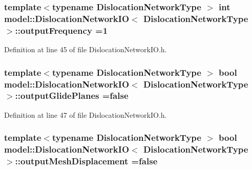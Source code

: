 \subsubsection[{output\+Frequency}]{\setlength{\rightskip}{0pt plus 5cm}template$<$typename Dislocation\+Network\+Type $>$ int {\bf model\+::\+Dislocation\+Network\+I\+O}$<$ Dislocation\+Network\+Type $>$\+::output\+Frequency =1\hspace{0.3cm}{\ttfamily [static]}}\label{structmodel_1_1_dislocation_network_i_o_a332e7031dfa21ac57b3d9816bb895007}


Definition at line 45 of file Dislocation\+Network\+I\+O.\+h.

\hypertarget{structmodel_1_1_dislocation_network_i_o_aeb79ef10bfde6bbb003b848cac1c305c}{}
\subsubsection[{output\+Glide\+Planes}]{\setlength{\rightskip}{0pt plus 5cm}template$<$typename Dislocation\+Network\+Type $>$ bool {\bf model\+::\+Dislocation\+Network\+I\+O}$<$ Dislocation\+Network\+Type $>$\+::output\+Glide\+Planes =false\hspace{0.3cm}{\ttfamily [static]}}\label{structmodel_1_1_dislocation_network_i_o_aeb79ef10bfde6bbb003b848cac1c305c}


Definition at line 47 of file Dislocation\+Network\+I\+O.\+h.

\hypertarget{structmodel_1_1_dislocation_network_i_o_affea60946cd055d674f5f35c799109ef}{}
\subsubsection[{output\+Mesh\+Displacement}]{\setlength{\rightskip}{0pt plus 5cm}template$<$typename Dislocation\+Network\+Type $>$ bool {\bf model\+::\+Dislocation\+Network\+I\+O}$<$ Dislocation\+Network\+Type $>$\+::output\+Mesh\+Displacement =false\hspace{0.3cm}{\ttfamily [static]}}\label{structmodel_1_1_dislocation_network_i_o_affea60946cd055d674f5f35c799109ef}


